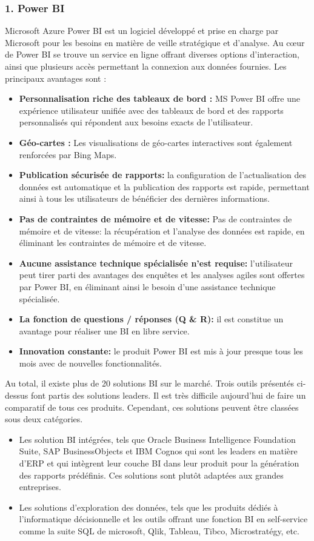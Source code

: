 \documentclass[french, a4paper, 12pt]{report}
\begin{document}
\subsubsection{1. Power BI}
Microsoft Azure Power BI est un logiciel développé et prise en charge par Microsoft pour les besoins en matière de veille stratégique et d'analyse. Au cœur de Power BI se trouve un service en ligne offrant diverses options d’interaction, ainsi que plusieurs accès permettant la connexion aux données fournies.
Les principaux avantages sont :
\begin{itemize}
\item \textbf{Personnalisation riche des tableaux de bord :}  MS Power BI offre une expérience utilisateur unifiée avec des tableaux de bord et des rapports personnalisés qui répondent aux besoins exacts de l'utilisateur. 
\item \textbf{Géo-cartes :} Les visualisations de géo-cartes interactives sont également renforcées par Bing Maps.
\item \textbf{Publication sécurisée de rapports:}  la configuration de l'actualisation des données est automatique et la publication des rapports est rapide, permettant ainsi à tous les utilisateurs de bénéficier des dernières informations.
\item \textbf{Pas de contraintes de mémoire et de vitesse:} Pas de contraintes de mémoire et de vitesse: la récupération et l’analyse des données est rapide, en éliminant les contraintes de mémoire et de vitesse.
\item \textbf{Aucune assistance technique spécialisée n’est requise:}  l’utilisateur peut tirer parti des avantages des enquêtes et les analyses agiles sont offertes par Power BI, en éliminant ainsi le besoin d’une assistance technique spécialisée.
\item \textbf{La fonction de questions / réponses (Q \& R):} il est constitue un avantage pour réaliser une BI en libre service.
\item \textbf{Innovation constante:}  le produit Power BI est mis à jour presque tous les mois avec de nouvelles fonctionnalités.\\
\end{itemize} 
Au total, il existe plus de 20 solutions BI sur le marché. Trois outils présentés ci-dessus font partis des solutions leaders. Il est très difficile aujourd’hui de faire un comparatif de tous ces produits. Cependant, ces solutions peuvent être classées sous deux catégories.
\begin{itemize}
\item \textbf{} Les solution BI intégrées, tels que Oracle Business Intelligence Foundation Suite, SAP BusinessObjects et IBM Cognos qui sont les leaders en matière d’ERP et qui intègrent leur couche BI dans leur produit pour la génération des rapports prédéfinis. Ces solutions sont plutôt adaptées aux grandes entreprises.
\item \textbf{} Les solutions d’exploration des données, tels que les produits dédiés à l’informatique décisionnelle et les outils offrant une fonction BI en self-service comme la suite SQL de microsoft, Qlik, Tableau, Tibco, Microstratégy, etc. 

\end{itemize} 
\end{document}
